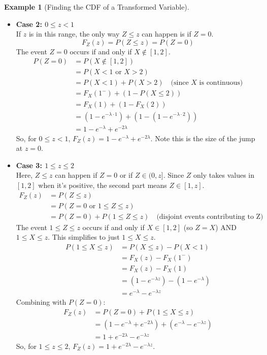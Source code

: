 \documentclass[11pt]{article}
\theoremstyle{definition}
\newtheorem{example}[definition]{Example}
\begin{document}
\begin{example}[Finding the CDF of a Transformed Variable]
\begin{itemize}
    \item \textbf{Case 2: $0 \le z < 1$} \\
    If $z$ is in this range, the only way $Z \le z$ can happen is if $Z=0$.
    \[ F_Z(z) = P(Z \le z) = P(Z=0) \]
    The event $Z=0$ occurs if and only if $X \notin [1, 2]$.
    \begin{align*} P(Z=0) &= P(X \notin [1, 2]) \\ &= P(X < 1 \text{ or } X > 2) \\ &= P(X < 1) + P(X > 2) \quad \text{(since } X \text{ is continuous)} \\ &= F_X(1^-) + (1 - P(X \le 2)) \\ &= F_X(1) + (1 - F_X(2)) \\ &= (1 - e^{-\lambda \cdot 1}) + (1 - (1 - e^{-\lambda \cdot 2})) \\ &= 1 - e^{-\lambda} + e^{-2\lambda} \end{align*}
    So, for $0 \le z < 1$, $F_Z(z) = 1 - e^{-\lambda} + e^{-2\lambda}$. Note this is the size of the jump at $z=0$.

    \item \textbf{Case 3: $1 \le z \le 2$} \\
    Here, $Z \le z$ can happen if $Z=0$ or if $Z \in (0, z]$. Since $Z$ only takes values in $[1, 2]$ when it's positive, the second part means $Z \in [1, z]$.
    \begin{align*} F_Z(z) &= P(Z \le z) \\ &= P(Z=0 \text{ or } 1 \le Z \le z) \\ &= P(Z=0) + P(1 \le Z \le z) \quad \text{(disjoint events contributing to Z)} \end{align*}
    The event $1 \le Z \le z$ occurs if and only if $X \in [1, 2]$ (so $Z=X$) AND $1 \le X \le z$. This simplifies to just $1 \le X \le z$.
    \begin{align*} P(1 \le X \le z) &= P(X \le z) - P(X < 1) \\ &= F_X(z) - F_X(1^-) \\ &= F_X(z) - F_X(1) \\ &= (1 - e^{-\lambda z}) - (1 - e^{-\lambda}) \\ &= e^{-\lambda} - e^{-\lambda z} \end{align*}
    Combining with $P(Z=0)$:
    \begin{align*} F_Z(z) &= P(Z=0) + P(1 \le X \le z) \\ &= (1 - e^{-\lambda} + e^{-2\lambda}) + (e^{-\lambda} - e^{-\lambda z}) \\ &= 1 + e^{-2\lambda} - e^{-\lambda z} \end{align*}
    So, for $1 \le z \le 2$, $F_Z(z) = 1 + e^{-2\lambda} - e^{-\lambda z}$.


\end{itemize}
\end{example}
\end{document}
